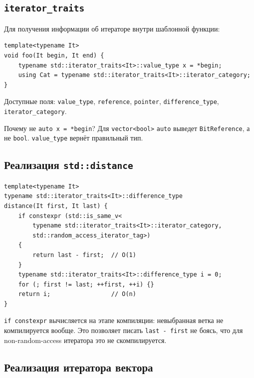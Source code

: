 \documentclass[a4paper,12pt]{article}
\begin{document}
\subsection{\texttt{iterator\_traits}}

Для получения информации об итераторе внутри шаблонной функции:

\begin{lstlisting}
template<typename It>
void foo(It begin, It end) {
    typename std::iterator_traits<It>::value_type x = *begin;
    using Cat = typename std::iterator_traits<It>::iterator_category;
}
\end{lstlisting}

Доступные поля: \texttt{value\_type}, \texttt{reference}, \texttt{pointer},
\texttt{difference\_type}, \texttt{iterator\_category}.

Почему не \texttt{auto x = *begin}? Для \texttt{vector<bool>} \texttt{auto}
выведет \texttt{BitReference}, а не \texttt{bool}. \texttt{value\_type}
вернёт правильный тип.

\subsection{Реализация \texttt{std::distance}}

\begin{lstlisting}
template<typename It>
typename std::iterator_traits<It>::difference_type
distance(It first, It last) {
    if constexpr (std::is_same_v<
        typename std::iterator_traits<It>::iterator_category,
        std::random_access_iterator_tag>)
    {
        return last - first;  // O(1)
    }
    typename std::iterator_traits<It>::difference_type i = 0;
    for (; first != last; ++first, ++i) {}
    return i;                 // O(n)
}
\end{lstlisting}

\texttt{if constexpr} вычисляется на этапе компиляции: невыбранная ветка
не компилируется вообще. Это позволяет писать \texttt{last - first} не
боясь, что для non-random-access итератора это не скомпилируется.

\subsection{Реализация итератора вектора}
\end{document}
